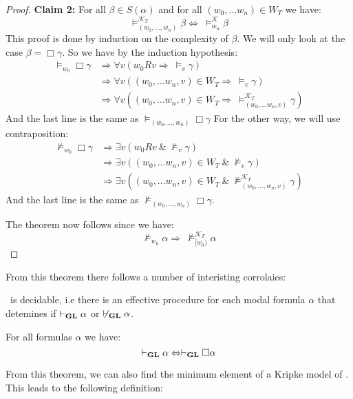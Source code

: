\documentclass[../main.tex]{subfiles}
\begin{document}
\begin{proof}
	\textbf{Claim 2:} For all $\beta\in S(\alpha)$ and for all $(w_0,\ldots
	w_n)\in W_T$ we have:
	$$\vDash^{\mathcal{K}_T}_{(w_0,\ldots,w_n)}\beta\Leftrightarrow\ \vDash_{w_n}^\mathcal{K}\beta$$
	This proof is done by induction on the complexity of $\beta$. We will
	only look at the case $\beta=\Box\gamma$. So we have by the induction
	hypothesis:
	\begin{align*}
		\vDash_{w_0}\Box\gamma&\Rightarrow\forall v(w_0Rv\Rightarrow\ 
		\vDash_v\gamma)\\
				      &\Rightarrow\forall v((w_0,\ldots
				      w_n,v)\in W_T\Rightarrow\
				      \vDash_v\gamma)\\
				      &\Rightarrow\forall v((w_0,\ldots
				      w_n,v)\in W_T\Rightarrow\
				      \vDash_{(w_0,\ldots w_n,v)}^{\mathcal{K}_T}\gamma)
	\end{align*}
	And the last line is the same as $\vDash_{(w_0,\ldots,w_n)}\Box\gamma$
	For the other way, we will use contraposition:
	\begin{align*}
		\not\vDash_{w_0}\Box\gamma&\Rightarrow \exists v(w_0Rv\ \&\
		\not\vDash_v\gamma)\\
					  &\Rightarrow\exists v((w_0,\ldots
					  w_n,v)\in W_T\ \&\
					  \not\vDash_v\gamma)\\
					  &\Rightarrow\exists v((w_0,\ldots
					  w_n,v)\in W_T\ \&\
					  \not\vDash_{(w_0,\ldots,w_n,v)}^{\mathcal{K}_T}\gamma)
	\end{align*}
	And the last line is the same as
	$\not\vDash_{(w_0,\ldots,w_n)}\Box\gamma$. 

	The theorem now follows since we have:
	$$\not\vDash_{w_0}\alpha\Rightarrow\
	\not\vDash_{[w_0)}^{\mathcal{K}_T}\alpha$$
\end{proof}

From this theorem there follows a number of interisting corrolaies:

\begin{cor}
	\GL\ is decidable, i.e there is an effective procedure for each modal formula
	$\alpha$ that detemines if $\vdash_{\text{\textbf{GL}}}\alpha$ or
	$\not\vdash_{\text{\textbf{GL}}}\alpha$.
\end{cor}
\begin{cor}
	\label{cor:Nec}
	For all formulas $\alpha$ we have:
	\[\vdash_{\text{\textbf{GL}}}\alpha\Leftrightarrow\vdash_{\text{\textbf{GL}}}\Box\alpha\]
\end{cor}

From this theorem, we can also find the minimum element of a Kripke model of
\GL. This leads to the following definition:
\end{document}
